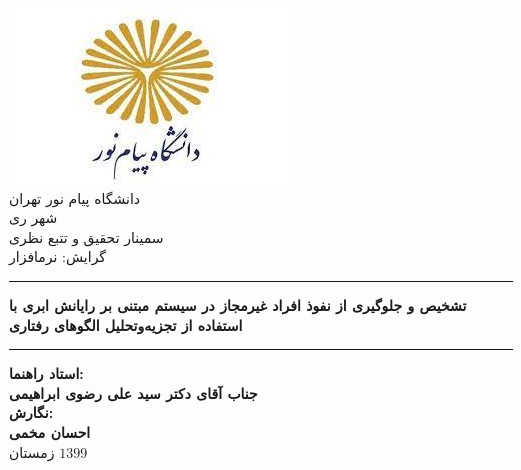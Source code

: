 \documentclass[a4paper,oneside,12pt]{report}
\begin{document}
\begin{center}
\vspace{\fill}
\includegraphics[scale=0.6]{logo}\\
\vspace{1cm}
دانشگاه پیام نور تهران\\
شهر ری\\
سمینار تحقیق و تتبع نظری\\
گرایش: نرم\/افزار
\\
\vspace{1cm}
\hrule height 4pt
\par
\vspace{0.2cm}
\Large\bfseries
تشخیص و جلوگیری از نفوذ افراد غیرمجاز در سیستم مبتنی بر رایانش ابری با استفاده از تجزیه‌وتحلیل الگوهای رفتاری
\vspace{0.2cm}
\par
\hrule height 4pt
\par
\vspace{2cm}
{\Large\bfseries
استاد راهنما:\\
جناب آقای دکتر سید علی رضوی ابراهیمی
}
\vspace{0.5cm}
\\
{\Large\bfseries
نگارش:\\
احسان مخمی
}
\vspace{1.5cm}
\\
\large{زمستان
$1399$}
\vspace{\fill}
\end{center}
\baselineskip=0.9cm
\newpage
\end{document}
